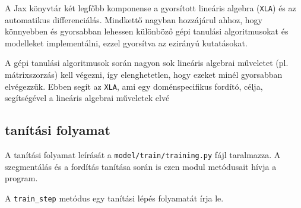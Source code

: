 A Jax könyvtár két legfőbb komponense a gyorsított lineáris algebra (\texttt{XLA}) és az automatikus differenciálás. Mindkettő nagyban hozzájárul ahhoz, hogy könnyebben és gyorsabban lehessen különböző gépi tanulási algoritmusokat és modelleket implementálni, ezzel gyorsítva az ezirányú kutatásokat.

A gépi tanulási algoritmusok során nagyon sok lineáris algebrai műveletet (pl. mátrixszorzás) kell végezni, így elenghetetlen, hogy ezeket minél gyorsabban elvégezzük. Ebben segít az \texttt{XLA}, ami egy doménspecifikus fordító, célja, segítségével a lineáris algebrai műveletek elvé 

\subsection{tanítási folyamat}
A tanítási folyamat leírását a \texttt{model/train/training.py} fájl
taralmazza. A szegmentálás és a fordítás tanítása során is ezen modul
metódusait hívja a program.

A \texttt{train_step} metódus egy tanítási lépés folyamatát írja le.

\cite{palmtree}
